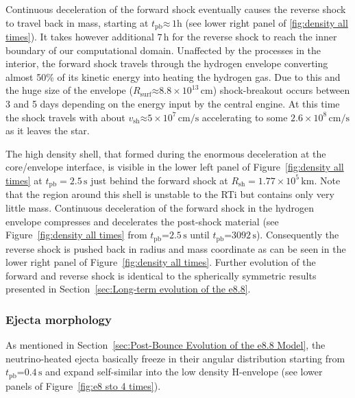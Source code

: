 \documentclass[fleqn,usenatbib]{mnras}
\newcommand{\tpb}{\ensuremath{t_{\text{pb}}}}
\newcommand{\km}{\ensuremath{\mathrm{km}}}
\newcommand{\s}{\ensuremath{\text{s}}}
\begin{document}
Continuous deceleration of the forward shock eventually causes the reverse shock to travel back in mass, starting at  $\tpb\mathord{\approx}\,1\text{h}$ (see lower right panel of \ref{fig:density all times}). It takes however additional $7\,\text{h}$ for the reverse shock to reach the inner boundary of our computational domain. 
Unaffected by the processes in the interior, the forward shock travels through the hydrogen envelope converting almost 50\% of its kinetic energy into heating the hydrogen gas. Due to this and the huge size of the envelope ($R_{\mathrm{surf}}\mathord{\approx}8.8\times10^{13}\,\mathrm{cm}$) shock-breakout occurs between 3 and 5 days depending on the energy input by the central engine. At this time the shock travels with about $v_{\mathrm{sh}}\mathord{\approx} 5\times 10^{7}\, \mathrm{cm/s}$ accelerating to some $2.6\times 10^{8}\, \mathrm{cm/s}$ as it leaves the star.

The high density shell, that formed during the enormous deceleration at the core/envelope interface, is visible in the lower left panel of Figure~\ref{fig:density all times} at $\tpb=2.5\,\s$ just behind the forward shock at $R_{\mathrm{sh}}=1.77\times10^{5}\,\km$. 
Note that the region around this shell is unstable to the RTi but contains only very little mass.
Continuous deceleration of the forward shock in the hydrogen envelope compresses and decelerates the post-shock material (see Figure~\ref{fig:density all times} from $\tpb\mathord{=}2.5\,\s$ until $\tpb\mathord{=}3092\,\s$). Consequently the reverse shock is pushed back in radius and mass coordinate as can be seen in the lower right panel of Figure~\ref{fig:density all times}. 
Further evolution of the forward and reverse shock is identical to the spherically symmetric results presented in Section~\ref{sec:Long-term evolution of the e8.8}. 

\subsubsection{Ejecta morphology}
As mentioned in Section~\ref{sec:Post-Bounce Evolution of the e8.8 Model}, the neutrino-heated ejecta basically freeze in their angular distribution starting from $\tpb\mathord{=}0.4\,\s$ and expand self-similar into the low density H-envelope (see lower panels of Figure~\ref{fig:e8 sto 4 times}). 
\end{document}
